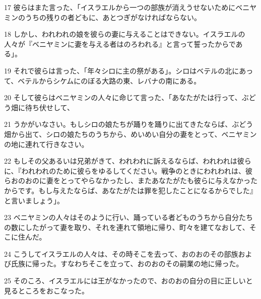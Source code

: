 \par 17 彼らはまた言った、「イスラエルから一つの部族が消えうせないためにベニヤミンのうちの残りの者どもに、あとつぎがなければならない。
\par 18 しかし、われわれの娘を彼らの妻に与えることはできない。イスラエルの人々が『ベニヤミンに妻を与える者はのろわれる』と言って誓ったからである」。
\par 19 それで彼らは言った、「年々シロに主の祭がある」。シロはベテルの北にあって、ベテルからシケムにのぼる大路の東、レバナの南にある。
\par 20 そして彼らはベニヤミンの人々に命じて言った、「あなたがたは行って、ぶどう畑に待ち伏せして、
\par 21 うかがいなさい。もしシロの娘たちが踊りを踊りに出てきたならば、ぶどう畑から出て、シロの娘たちのうちから、めいめい自分の妻をとって、ベニヤミンの地に連れて行きなさい。
\par 22 もしその父あるいは兄弟がきて、われわれに訴えるならば、われわれは彼らに、『われわれのために彼らをゆるしてください。戦争のときにわれわれは、彼らおのおのに妻をとってやらなかったし、またあなたがたも彼らに与えなかったからです。もし与えたならば、あなたがたは罪を犯したことになるからでした』と言いましょう」。
\par 23 ベニヤミンの人々はそのように行い、踊っている者どものうちから自分たちの数にしたがって妻を取り、それを連れて領地に帰り、町々を建てなおして、そこに住んだ。
\par 24 こうしてイスラエルの人々は、その時そこを去って、おのおのその部族および氏族に帰った。すなわちそこを立って、おのおのその嗣業の地に帰った。
\par 25 そのころ、イスラエルには王がなかったので、おのおの自分の目に正しいと見るところをおこなった。


